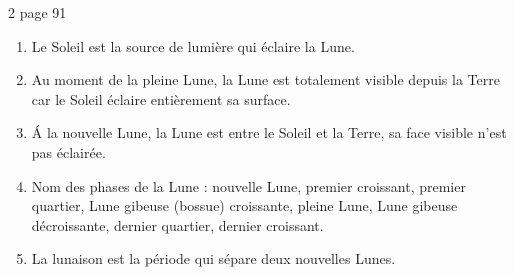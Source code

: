 \begin{myact}{2 page 91}
	\begin{enumerate}
		\item Le Soleil est la source de lumière qui éclaire la Lune.\pause
		\item Au moment de la pleine Lune, la Lune est totalement visible depuis la Terre car le Soleil éclaire entièrement sa surface.\pause
		\item \'A la nouvelle Lune, la Lune est entre le Soleil et la Terre, sa face visible n'est pas éclairée.\pause
		\item Nom des phases de la Lune : nouvelle Lune, premier croissant, premier quartier, Lune gibeuse (bossue) croissante, pleine Lune, Lune gibeuse décroissante, dernier quartier, dernier croissant.\pause
		\item La lunaison est la période qui sépare deux nouvelles Lunes.
	\end{enumerate}
\end{myact}